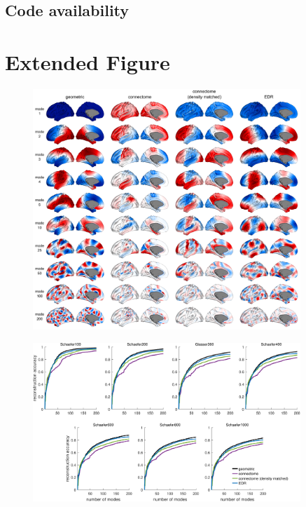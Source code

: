 \documentclass[sn-mathphys-num]{sn-jnl}%
\theoremstyle{thmstyleone}%
\theoremstyle{thmstyletwo}%
\theoremstyle{thmstylethree}%
\begin{document}
\subsection{Code availability} \label{sec:code_availability}


\section{Extended Figure}

\begin{figure}[!htb] 
	\centering
	\includegraphics[width=0.9\textwidth]{fig/extended_fig_1.pdf}
	\caption{
	} \label{fig:extended_fig_1}
\end{figure}


\begin{figure}[!htb] 
	\centering
	\includegraphics[width=0.9\textwidth]{fig/extended_fig_2.pdf}
	\caption{
	} \label{fig:extended_fig_2}
\end{figure}
\end{document}
